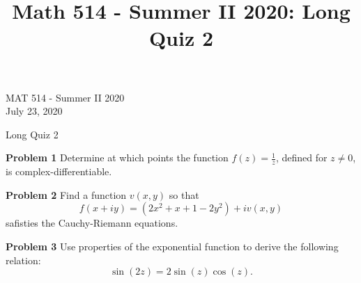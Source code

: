 \documentclass[12pt,oneside]{exam}
\title{Math 514 - Summer II 2020: Long Quiz 2}
\newenvironment{exercise}[1]{\vspace{.1in}\noindent\textbf{Problem #1 \hspace{.05em}}}{}
\begin{document}
\begin{flushright}
\sc MAT 514 - Summer II 2020\\
July 23, 2020
\end{flushright}
\bigskip
 
\begin{center}
\textsf{Long Quiz 2} 
\end{center}


\begin{exercise}{1}
Determine at which points the function $f(z)=\frac{1}{\overline{z}}$, defined for $z\neq 0$, is complex-differentiable. 
\end{exercise}

\vfill
\begin{exercise}{2}
Find a function $v(x,y)$ so that 
\begin{equation*}
f(x+iy) = (2x^2+x+1-2y^2) + iv(x,y)
\end{equation*}
safisties the Cauchy-Riemann equations.
\end{exercise}
\vfill

\newpage

\begin{exercise}{3}
Use properties of the exponential function to derive the following relation:
\begin{equation*}
\sin(2z) = 2\sin(z)\cos(z).
\end{equation*}
\end{exercise}
\vfill 
\end{document}
